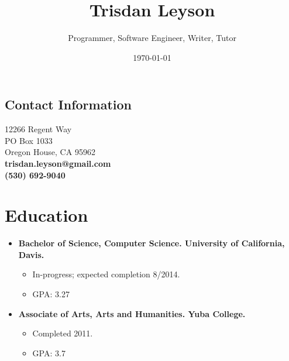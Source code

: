 \documentclass[12pt]{article}
\title{Trisdan Leyson}
\author{Programmer, Software Engineer, Writer, Tutor}
\date{\today}
\begin{document}
\maketitle

\begin{center}
\section*{Contact Information}
\label{sec-1}
12266 Regent Way\\
PO Box 1033\\
Oregon House, CA 95962\\
\textbf{trisdan.leyson@gmail.com}\\
\textbf{(530) 692-9040}\\
\end{center}
\section*{Education}
\label{sec-2}

\begin{itemize}
\item \textbf{Bachelor of Science, Computer Science. University of California, Davis.}
\begin{itemize}
\item In-progress; expected completion 8/2014.
\item GPA: 3.27
\end{itemize}
\item \textbf{Associate of Arts, Arts and Humanities. Yuba College.}
\begin{itemize}
\item Completed 2011.
\item GPA: 3.7
\end{itemize}
\end{itemize}
\end{document}
